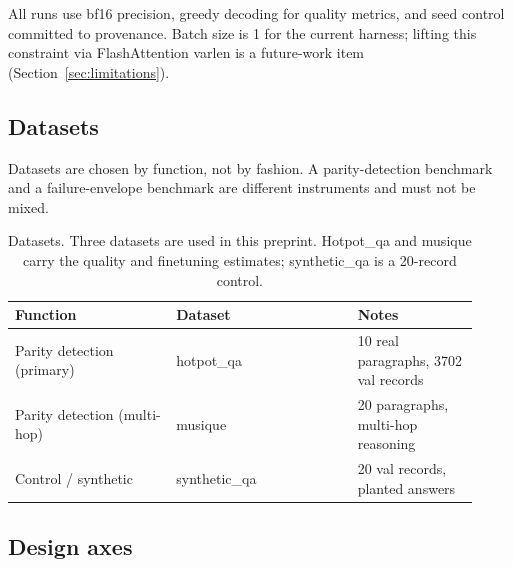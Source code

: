 All runs use bf16 precision, greedy decoding for quality metrics, and
seed control committed to provenance. Batch size is 1 for the current
harness; lifting this constraint via FlashAttention varlen is a
future-work item (Section~\ref{sec:limitations}).

\subsection{Datasets}
\label{sec:design-datasets}

Datasets are chosen by function, not by fashion. A parity-detection
benchmark and a failure-envelope benchmark are different instruments and
must not be mixed.

\begin{table}[t]
\centering
\caption{Datasets. Three datasets are used in this preprint. Hotpot\_qa
    and musique carry the quality and finetuning estimates; synthetic\_qa
    is a 20-record control.}
\label{tab:datasets}
\begin{tabular}{@{}p{0.32\linewidth}p{0.36\linewidth}p{0.24\linewidth}@{}}
\toprule
Function & Dataset & Notes \\
\midrule
Parity detection (primary) & hotpot\_qa & 10 real paragraphs, 3702 val records \\
Parity detection (multi-hop) & musique & 20 paragraphs, multi-hop reasoning \\
Control / synthetic & synthetic\_qa & 20 val records, planted answers \\
\bottomrule
\end{tabular}
\end{table}

\subsection{Design axes}
\label{sec:design-axes}

